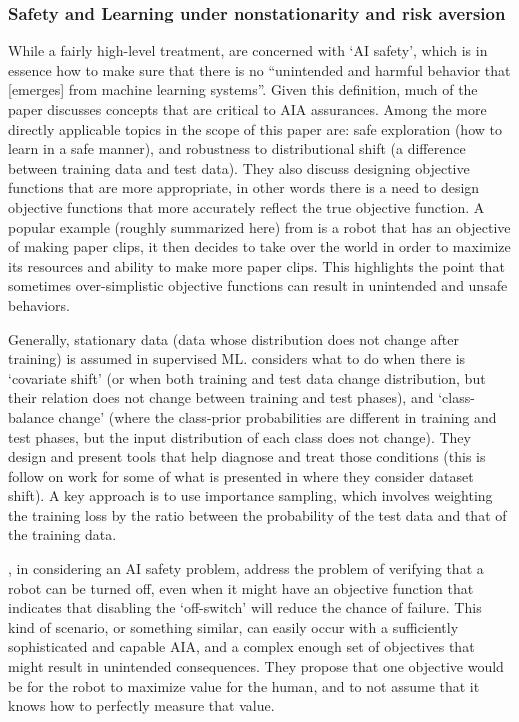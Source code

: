 \subsubsection{Safety and Learning under nonstationarity and risk aversion} \label{sec:safety}
    While a fairly high-level treatment, \citet{Amodei2016-xi} are concerned with `AI safety', which is in essence how to make sure that there is no ``unintended and harmful behavior that [emerges] from machine learning systems''. Given this definition, much of the paper discusses concepts that are critical to AIA assurances. Among the more directly applicable topics in the scope of this paper are: safe exploration (how to learn in a safe manner), and robustness to distributional shift (a difference between training data and test data). They also discuss designing objective functions that are more appropriate, in other words there is a need to design objective functions that more accurately reflect the true objective function. A popular example (roughly summarized here) from \citet{Bostrom2014-fz} is a robot that has an objective of making paper clips, it then decides to take over the world in order to maximize its resources and ability to make more paper clips. This highlights the point that sometimes over-simplistic objective functions can result in unintended and unsafe behaviors.

    Generally, stationary data (data whose distribution does not change after training) is assumed in supervised ML. \citet{Sugiyama2013-ci} considers what to do when there is `covariate shift' (or when both training and test data change distribution, but their relation does not change between training and test phases), and `class-balance change' (where the class-prior probabilities are different in training and test phases, but the input distribution of each class does not change). They design and present tools that help diagnose and treat those conditions (this is follow on work for some of what is presented in \citet{Quinonero-Candela2009-fj} where they consider dataset shift). A key approach is to use importance sampling, which involves weighting the training loss by the ratio between the probability of the test data and that of the training data.

    \citet{Hadfield-Menell2016-ws}, in considering an AI safety problem, address the problem of verifying that a robot can be turned off, even when it might have an objective function that indicates that disabling the `off-switch' will reduce the chance of failure. This kind of scenario, or something similar, can easily occur with a sufficiently sophisticated and capable AIA, and a complex enough set of objectives that might result in unintended consequences. They propose that one objective would be for the robot to maximize value for the human, and to not assume that it knows how to perfectly measure that value. 

